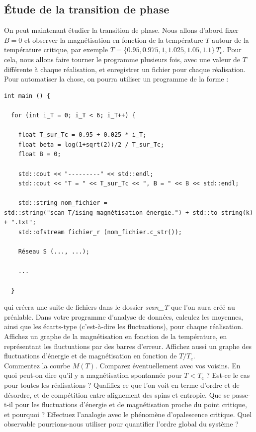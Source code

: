 \documentclass{book}
\def\filename{\emph}
\begin{document}
\subsection{Étude de la transition de phase}

On peut maintenant étudier la transition de phase. Nous allons d'abord fixer $B=0$ et observer la magnétisation en fonction de la température $T$ autour de la température critique, par exemple $T=\{0.95,0.975,1,1.025,1.05,1.1\}\,T_\text{c}$. Pour cela, nous allons faire tourner le programme plusieurs fois, avec une valeur de $T$ différente à chaque réalisation, et enregistrer un fichier pour chaque réalisation. Pour automatiser la chose, on pourra utiliser un programme de la forme :
\begin{verbatim}
int main () {

  for (int i_T = 0; i_T < 6; i_T++) {

    float T_sur_Tc = 0.95 + 0.025 * i_T;
    float beta = log(1+sqrt(2))/2 / T_sur_Tc;
    float B = 0;

    std::cout << "---------" << std::endl;
    std::cout << "T = " << T_sur_Tc << ", B = " << B << std::endl;

    std::string nom_fichier = std::string("scan_T/ising_magnétisation_énergie.") + std::to_string(k) + ".txt";
    std::ofstream fichier_r (nom_fichier.c_str());

    Réseau S (..., ...);

    ...

  }
\end{verbatim}
qui créera une suite de fichiers dans le dossier \filename{scan\_T} que l'on aura créé au préalable. Dans votre programme d'analyse de données, calculez les moyennes, ainsi que les écarts-type (c'est-à-dire les fluctuations), pour chaque réalisation. Affichez un graphe de la magnétisation en fonction de la température, en représentant les fluctuations par des barres d'erreur. Affichez aussi un graphe des fluctuations d'énergie et de magnétisation en fonction de $T/T_\text{c}$.\\

Commentez la courbe $M(T)$. Comparez éventuellement avec vos voisins. En quoi peut-on dire qu'il y a magnétisation spontannée pour $T < T_\text{c}$ ? Est-ce le cas pour toutes les réalisations ? Qualifiez ce que l'on voit en terme d'ordre et de désordre, et de compétition entre alignement des spins et entropie. Que se passe-t-il pour les fluctuations d'énergie et de magnétisation proche du point critique, et pourquoi ? Effectuez l'analogie avec le phénomène d'opalescence critique. Quel observable pourrions-nous utiliser pour quantifier l'ordre global du système ?\\
\end{document}
